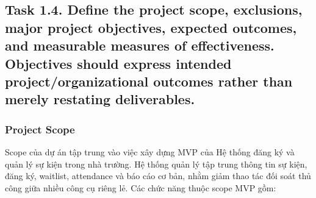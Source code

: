 \subsection{Task 1.4. Define the project scope, exclusions, major project objectives, expected outcomes, and measurable measures of effectiveness. Objectives should express intended project/organizational outcomes rather than merely restating deliverables.}

\subsubsection{Project Scope}

Scope của dự án tập trung vào việc xây dựng MVP của Hệ thống đăng ký và quản lý sự kiện trong nhà trường. Hệ thống quản lý tập trung thông tin sự kiện, đăng ký, waitlist, attendance và báo cáo cơ bản, nhằm giảm thao tác đối soát thủ công giữa nhiều công cụ riêng lẻ. Các chức năng thuộc scope MVP gồm:

